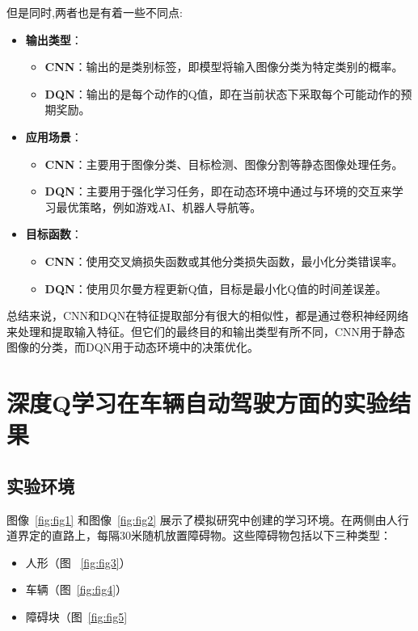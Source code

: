 \documentclass{article}
\begin{document}
但是同时,两者也是有着一些不同点:
\begin{itemize}
    \item \textbf{输出类型}：
    \begin{itemize}
        \item \textbf{CNN}：输出的是类别标签，即模型将输入图像分类为特定类别的概率。
        \item \textbf{DQN}：输出的是每个动作的Q值，即在当前状态下采取每个可能动作的预期奖励。
    \end{itemize}
    \item \textbf{应用场景}：
    \begin{itemize}
        \item \textbf{CNN}：主要用于图像分类、目标检测、图像分割等静态图像处理任务。
        \item \textbf{DQN}：主要用于强化学习任务，即在动态环境中通过与环境的交互来学习最优策略，例如游戏AI、机器人导航等。
    \end{itemize}
    \item \textbf{目标函数}：
    \begin{itemize}
        \item \textbf{CNN}：使用交叉熵损失函数或其他分类损失函数，最小化分类错误率。
        \item \textbf{DQN}：使用贝尔曼方程更新Q值，目标是最小化Q值的时间差误差。
    \end{itemize}
\end{itemize}

总结来说，CNN和DQN在特征提取部分有很大的相似性，都是通过卷积神经网络来处理和提取输入特征。但它们的最终目的和输出类型有所不同，CNN用于静态图像的分类，而DQN用于动态环境中的决策优化。


\section{深度Q学习在车辆自动驾驶方面的实验结果}

\subsection{实验环境}
图像~\ref{fig:fig1} 和图像~\ref{fig:fig2} 展示了模拟研究中创建的学习环境。在两侧由人行道界定的直路上，每隔30米随机放置障碍物。这些障碍物包括以下三种类型：
\begin{itemize}
  \item 人形（图 ~\ref{fig:fig3}）
  \item 车辆（图~\ref{fig:fig4}）
  \item 障碍块（图~\ref{fig:fig5}
\end{itemize}
\end{document}
